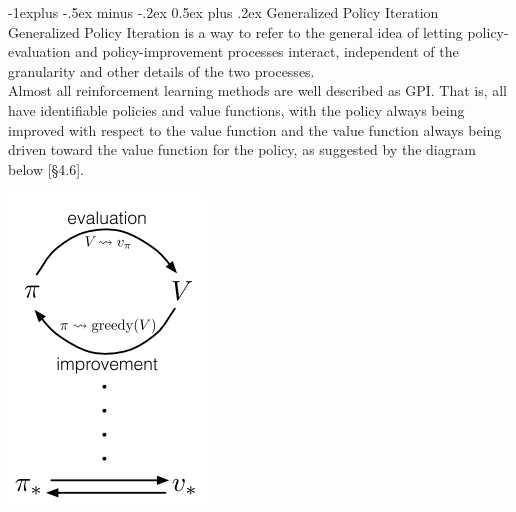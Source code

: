 \documentclass[10pt,landscape]{article}
\makeatletter
\renewcommand{\subsection}{\@startsection{subsection}{2}{0mm}%
                                {-1explus -.5ex minus -.2ex}%
                                {0.5ex plus .2ex}%
                                {\normalfont\normalsize\bfseries}}
\makeatother
\begin{document}
\begin{multicols}{3}
\subsection{Generalized Policy Iteration}
Generalized Policy Iteration is a way to refer to the general idea of letting policy-evaluation and policy-improvement processes interact, independent of the granularity and other details of the two processes. \\
Almost all reinforcement learning methods are well described as GPI. That is, all have identifiable policies and value functions, with the policy always being improved with respect to the value function and the value function always being driven toward the value function for the policy, as suggested by the diagram below [§4.6].
\begin{center}
\includegraphics[width=0.6\linewidth]{./images/GPI.png}
\end{center}

\end{multicols}

\newpage
\end{document}
